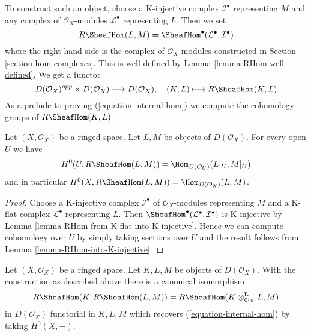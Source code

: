 \medskip\noindent
To construct such an object, choose a K-injective complex
$\mathcal{I}^\bullet$ representing $M$ and any complex of
$\mathcal{O}_X$-modules $\mathcal{L}^\bullet$ representing $L$.
Then we set
$$
R\SheafHom(L, M) = \SheafHom^\bullet(\mathcal{L}^\bullet, \mathcal{I}^\bullet)
$$
where the right hand side is the complex of $\mathcal{O}_X$-modules
constructed in Section \ref{section-hom-complexes}.
This is well defined by Lemma \ref{lemma-RHom-well-defined}.
We get a functor
$$
D(\mathcal{O}_X)^{opp} \times D(\mathcal{O}_X) \longrightarrow D(\mathcal{O}_X),
\quad
(K, L) \longmapsto R\SheafHom(K, L)
$$
As a prelude to proving (\ref{equation-internal-hom})
we compute the cohomology groups of $R\SheafHom(K, L)$.

\begin{lemma}
\label{lemma-section-RHom-over-U}
Let $(X, \mathcal{O}_X)$ be a ringed space. Let $L, M$ be objects
of $D(\mathcal{O}_X)$. For every open $U$ we have
$$
H^0(U, R\SheafHom(L, M)) =
\Hom_{D(\mathcal{O}_U)}(L|_U, M|_U)
$$
and in particular $H^0(X, R\SheafHom(L, M)) = \Hom_{D(\mathcal{O}_X)}(L, M)$.
\end{lemma}

\begin{proof}
Choose a K-injective complex $\mathcal{I}^\bullet$ of
$\mathcal{O}_X$-modules representing $M$ and a K-flat complex
$\mathcal{L}^\bullet$ representing $L$. Then
$\SheafHom^\bullet(\mathcal{L}^\bullet, \mathcal{I}^\bullet)$
is K-injective by Lemma \ref{lemma-RHom-from-K-flat-into-K-injective}.
Hence we can compute cohomology over $U$ by simply taking sections over $U$
and the result follows from Lemma \ref{lemma-RHom-into-K-injective}.
\end{proof}

\begin{lemma}
\label{lemma-internal-hom}
Let $(X, \mathcal{O}_X)$ be a ringed space. Let $K, L, M$ be objects
of $D(\mathcal{O}_X)$. With the construction as described above
there is a canonical isomorphism
$$
R\SheafHom(K, R\SheafHom(L, M)) =
R\SheafHom(K \otimes_{\mathcal{O}_X}^\mathbf{L} L, M)
$$
in $D(\mathcal{O}_X)$ functorial in $K, L, M$
which recovers (\ref{equation-internal-hom}) by taking $H^0(X, -)$.
\end{lemma}

